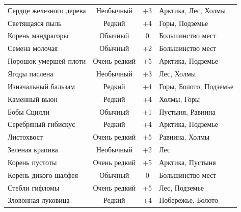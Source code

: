 \documentclass[a4paper, 9pt, twocolumn]{book}
\begin{document}
\begin{table}[H]
\begin{tabularx}{\linewidth}{X C c X}
			Сердце железного дерева & Необычный & +3 & Арктика, Лес, Холмы \\
			
			Светящаяся пыль & Редкий & +4 & Горы, Подземье \\
			
			Корень мандрагоры & Обычный & 0 & Большинство мест \\
			
			Семена молочая & Обычный & +2 & Большинство мест \\
			
			Порошок умершей плоти & Очень редкий & +5 & Арктика, Подземье \\
			
			Ягоды паслена & Необычный & +3 & Лес, Холмы \\
			
			Изначальный бальзам & Редкий & +4 & Горы, Болото, Подземье \\
			
			Каменный вьюн & Редкий & +4 & Холмы, Горы \\
			
			Бобы Сцилли & Обычный & +1 & Пустыня, Равнина \\
			
			Серебряный гибискус & Редкий & +4 & Арктика, Подземье \\
			
			Листохвост & Очень редкий & +5 & Равнина, Холмы \\
			
			Зеленая крапива & Необычный & +2 & Лес \\
			
			Корень пустоты & Очень редкий & +5 & Арктика, Пустыня \\
			
			Корень дикого шалфея & Обычный & 0 & Большинство мест \\
			
			Стебли гифломы & Очень редкий & +5 & Лес, Подземье \\
			
			Зловонная луковица & Редкий & +4 & Побережье, Болото \\
			
		\end{tabularx}
	\end{table}
\end{document}
